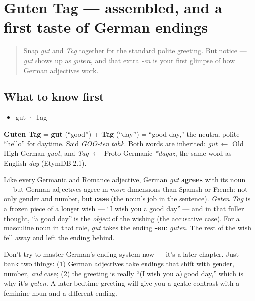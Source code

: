 \section[Guten Tag]{Guten Tag — assembled, and a first taste of German endings}

\label{lesson:GE-C01-guten-tag}



\begin{quote}
Snap \emph{gut} and \emph{Tag} together for the standard polite greeting. But notice — \emph{gut} shows up as \emph{gut\textbf{en}}, and that extra \emph{-en} is your first glimpse of how German adjectives work.
\end{quote}

\subsection*{What to know first}
\begin{itemize}
\raggedright
  \item gut · Tag
\end{itemize}

\begin{cousinweb}
\textbf{Guten Tag} = \textbf{gut} (\textquotedblleft{}good\textquotedblright{}) + \textbf{Tag} (\textquotedblleft{}day\textquotedblright{}) = \textquotedblleft{}good day,\textquotedblright{} the neutral polite \textquotedblleft{}hello\textquotedblright{} for daytime. Said \emph{GOO-ten tahk}. Both words are inherited: \emph{gut} $\leftarrow$ Old High German \emph{guot}, and \emph{Tag} $\leftarrow$ Proto-Germanic \emph{*dagaz}, the same word as English \emph{day} (EtymDB 2.1).
\end{cousinweb}

\begin{grammarlens}[title={Grammar Lens: why \emph{guten}, not \emph{gut}?}]
Like every Germanic and Romance adjective, German \emph{gut} \textbf{agrees} with its noun — but German adjectives agree in \emph{more} dimensions than Spanish or French: not only gender and number, but \textbf{case} (the noun's job in the sentence). \emph{Guten Tag} is a frozen piece of a longer wish — \textquotedblleft{}I wish you a good day\textquotedblright{} — and in that fuller thought, \textquotedblleft{}a good day\textquotedblright{} is the \emph{object} of the wishing (the accusative case). For a masculine noun in that role, \emph{gut} takes the ending \textbf{-en}: \emph{guten}. The rest of the wish fell away and left the ending behind.

Don't try to master German's ending system now — it's a later chapter. Just bank two things: (1) German adjectives take endings that shift with gender, number, \emph{and} case; (2) the greeting is really \textquotedblleft{}(I wish you a) good day,\textquotedblright{} which is why it's \emph{guten}. A later bedtime greeting will give you a gentle contrast with a feminine noun and a different ending.
\end{grammarlens}

